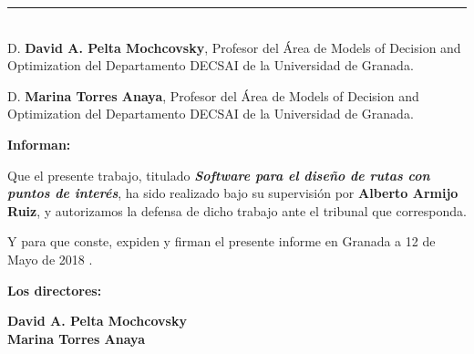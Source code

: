 \noindent\rule[-1ex]{\textwidth}{2pt}\\[4.5ex]

D. \textbf{David A. Pelta Mochcovsky}, Profesor del Área de Models of Decision and Optimization del Departamento DECSAI de la Universidad de Granada.\newline

D. \textbf{Marina Torres Anaya}, Profesor del Área de Models of Decision and Optimization del Departamento DECSAI de la Universidad de Granada.

\vspace{0.5cm}

\textbf{Informan:}

\vspace{0.5cm}

Que el presente trabajo, titulado \textit{\textbf{Software para el diseño de rutas con puntos de interés}},
ha sido realizado bajo su supervisión por \textbf{Alberto Armijo Ruiz}, y autorizamos la defensa de dicho trabajo ante el tribunal
que corresponda.

\vspace{0.5cm}

Y para que conste, expiden y firman el presente informe en Granada a 12 de Mayo de 2018 .

\vspace{1cm}

\textbf{Los directores:}

\vspace{5cm}

\noindent \textbf{David A. Pelta Mochcovsky} \\
\noindent \textbf{Marina Torres Anaya}


